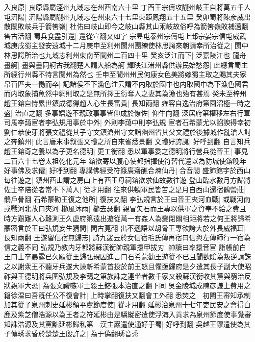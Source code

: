 入良原|{
	良原縣屬涇州九域志在州西南六十里}
丁酉王宗儔攻隴州岐王自將萬五千人屯汧陽|{
	汧陽縣屬隴州九域志在州東六十七里東距鳳翔五十五里}
癸卯蜀將陳彦威出散關敗岐兵于箭筈嶺|{
	杜佑曰岐山即今之岐山縣其山兩岐故俗呼為箭筈嶺敗補邁翻筈古活翻}
蜀兵食盡引還|{
	還從宣翻又如字}
宗昱屯泰州宗儔屯上邽宗晏宗信屯威武城庚戌蜀主發安遠城十二月庚申至利州閬州團練使林思諤來朝請幸所治從之|{
	閬中林思諤所治也九域志利州東南至閬州二百四十里}
癸亥泛江而下|{
	泛嘉陵江也}
龍舟畫舸|{
	畫與畫同舸古我翻楚人謂大船為舸}
輝映江渚州縣供辦民始愁怨|{
	此總言蜀主所經行州縣不特言閬州為然也}
壬申至閬州州民何康女色美將嫁蜀主取之賜其夫家帛百匹夫一慟而卒|{
	記諸侯不下漁色注云謂不内取於國中也内取國中為下漁色國君而内取象捕魚然中網則取之是無所擇王衍奪人之妻其為漁也殆有甚焉}
癸未至梓州　趙王鎔自恃累世鎮成德得趙人心生長富貴|{
	長知兩翻}
雍容自逸治府第園沼極一時之盛|{
	治直之翻}
多事嬉遊不親政事事皆仰成於僚佐|{
	仰牛向翻}
深居府第權移左右行軍司馬李藹宦者李弘規用事於中外|{
	外則李藹中則李弘規}
宦者石希蒙尤以諂諛得幸初劉仁恭使牙將張文禮從其子守文鎮滄州守文詣幽州省其父文禮於後據城作亂滄人討之奔鎮州|{
	此言唐末事叙張文禮之所自來省悉景翻}
文禮好誇誕|{
	好呼到翻}
自言知兵趙王鎔奇之養以為子更名德明|{
	更工衡翻}
悉以軍事委之德明將行營兵從晉王|{
	事見二百六十七卷太祖乾化元年}
鎔欲寄以腹心使都指揮使符習代還以為防城使鎔晚年好事佛及求僊|{
	好呼到翻}
專講佛經受符籙廣齋醮合煉仙丹|{
	合音閤}
盛飾館宇於西山每往遊之|{
	鎮州西山謂之房山上有西王母祠鎔欲求仙故數往遊}
登山臨水數月方歸將佐士卒陪從者常不下萬人|{
	從才用翻}
往來供頓軍民皆苦之是月自西山還宿鶻營莊|{
	鶻戶骨翻}
石希蒙勸王復之他所|{
	復扶又翻}
李弘規言於王曰晉王夾河血戰|{
	或戰河南或戰河北故曰夾河}
櫛風沐雨|{
	櫛去瑟翻}
親冒矢石而王專以供軍之資奉不給之費且時方艱難人心難測王久虚府第遠出遊從萬一有姦人為變閉關相距將若之何王將歸希蒙密言於王曰弘規妄生猜間|{
	間古莧翻}
出不遜語以刼脅王專欲誇大於外長威福耳|{
	長知兩翻}
王遂留信宿無歸志|{
	詩九罭云於女信宿毛氏傳再宿曰信與左傳師行一宿為信之義不同}
弘規乃教内牙都將蘇漢衡帥親軍擐甲拔刃|{
	帥讀曰率擐音宦}
詣帳前白王曰士卒暴露已久願從王歸弘規因進言曰石希蒙勸王遊從不已且聞欲隂為叛逆請誅之以謝衆王不聽牙兵遂大譟斬希蒙首投於前王怒且懼亟歸府是夕遣其長子副大使昭祚與王德明將兵圍弘規及李藹之第族誅之連坐者數千家又殺蘇漢衡收其黨與窮治反狀親軍大恐|{
	為張文禮嗾軍士殺王鎔張本治直之翻下同}
吳金陵城成陳彦謙上費用之籍徐温曰吾旣任公不復會計|{
	上時掌翻復扶又翻會工外翻}
悉焚之　初閩王審知承制加其從子泉州刺史延彬領平盧節度使|{
	從才用翻}
延彬治泉州十七年吏民安之會得白鹿及紫芝僧浩源以為王者之符延彬由是驕縱密遣使浮海入貢求為泉州節度使事覺審知誅浩源及其黨黜延彬歸私第　漢主巖遣使通好于蜀|{
	好呼到翻}
吳越王鏐遣使為其子傳琇求昏於楚楚王殷許之|{
	為于偽翻琇音秀}


